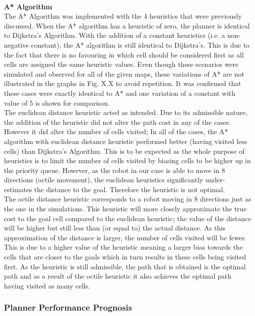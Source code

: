 \documentclass[a4paper,12pt]{article}
\begin{document}
				\\
				\textbf{A* Algorithm}
				\\ 
				The A* Algorithm was implemented with the 4 heuristics that were previously discussed. When the A* algorithm has a heuristic of zero, the planner is identical to Dijkstra's Algorithm. With the addition of a constant heuristics (i.e. a non-negative constant), the A* algorithm is still identical to Dijkstra's. This is due to the fact that there is no favouring in which cell should be considered first as all cells are assigned the same heuristic values. Even though these scenarios were simulated and observed for all of the given maps, these variations of A* are not illustrated in the graphs in Fig. X.X to avoid repetition. It was confirmed that these cases were exactly identical to A* and one variation of a constant with value of 5 is shown for comparison.
				\\
				The euclidean distance heuristic acted as intended. Due to its admissible nature, the addition of the heuristic did not alter the path cost in any of the cases. However it did alter the number of cells visited; In all of the cases, the A* algorithm with euclidean distance heuristic performed better (having visited less cells) than Dijkstra's Algorithm. This is to be expected as the whole purpose of heuristics is to limit the number of cells visited by biasing cells to be higher up in the priority queue. However, as the robot in our case is able to move in 8 directions (octile movement), the euclidean heuristics significantly under-estimates the distance to the goal. Therefore the heuristic is not optimal.
				\\
				The octile distance heuristic corresponds to a robot moving in 8 directions just as the one in the simulations. This heuristic will more closely approximate the true cost to the goal cell compared to the euclidean heuristic; the value of the distance will be higher but still less than (or equal to) the actual distance. As this approximation of the distance is larger, the number of cells visited will be fewer. This is due to a higher value of the heuristic meaning a larger bias towards the cells that are closer to the goals which in turn results in these cells being visited first. As the heuristic is still admissible, the path that is obtained is the optimal path and as a result of the octile heuristic it also achieves the optimal path having visited as many cells. 
				\\
				
				
			\subsubsection{Planner Performance Prognosis}
			
\end{document}
